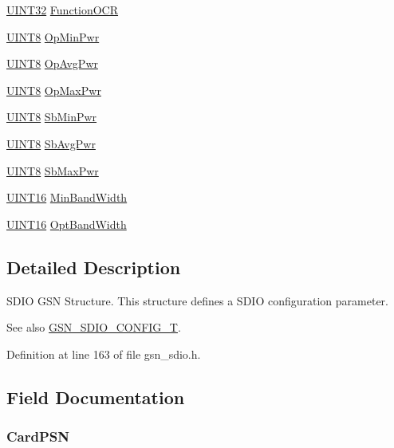 \begin{DoxyCompactItemize}
\item 
\hyperlink{a00660_gae1e6edbbc26d6fbc71a90190d0266018}{UINT32} \hyperlink{a00458_a90613787898c0d6ad52dfb62249a36fa}{FunctionOCR}
\item 
\hyperlink{a00660_gab27e9918b538ce9d8ca692479b375b6a}{UINT8} \hyperlink{a00458_a9921b7d97f22669836b23be2243a8ccd}{OpMinPwr}
\item 
\hyperlink{a00660_gab27e9918b538ce9d8ca692479b375b6a}{UINT8} \hyperlink{a00458_a40ad00813824b58b4197c7e1fdab4cd1}{OpAvgPwr}
\item 
\hyperlink{a00660_gab27e9918b538ce9d8ca692479b375b6a}{UINT8} \hyperlink{a00458_a25b4409967d9dda1f60960d518c3c02d}{OpMaxPwr}
\item 
\hyperlink{a00660_gab27e9918b538ce9d8ca692479b375b6a}{UINT8} \hyperlink{a00458_ad40e957d507a4267180bdb5cb444d794}{SbMinPwr}
\item 
\hyperlink{a00660_gab27e9918b538ce9d8ca692479b375b6a}{UINT8} \hyperlink{a00458_af22ad1df5e2fb4353ac071a07f1e7c25}{SbAvgPwr}
\item 
\hyperlink{a00660_gab27e9918b538ce9d8ca692479b375b6a}{UINT8} \hyperlink{a00458_a6698afaee7364accf9f73d4c683fe61d}{SbMaxPwr}
\item 
\hyperlink{a00660_ga09f1a1fb2293e33483cc8d44aefb1eb1}{UINT16} \hyperlink{a00458_acce1e9cc84e91664014d1c779a177b9b}{MinBandWidth}
\item 
\hyperlink{a00660_ga09f1a1fb2293e33483cc8d44aefb1eb1}{UINT16} \hyperlink{a00458_a80de9a51411a9d0a746c3809adef4977}{OptBandWidth}
\end{DoxyCompactItemize}


\subsection{Detailed Description}
SDIO GSN Structure. This structure defines a SDIO configuration parameter. 

\begin{DoxySeeAlso}{See also}
\hyperlink{a00653_ga741fda4dc2cd93143a8a73ddaace7de8}{GSN\_\-SDIO\_\-CONFIG\_\-T}. 
\end{DoxySeeAlso}


Definition at line 163 of file gsn\_\-sdio.h.



\subsection{Field Documentation}
\hypertarget{a00458_afb491caeb31470f9deb06462c2ae0c4b}{
\subsubsection[{CardPSN}]{ {\bf CardPSN}}}
\label{a00458_afb491caeb31470f9deb06462c2ae0c4b}


